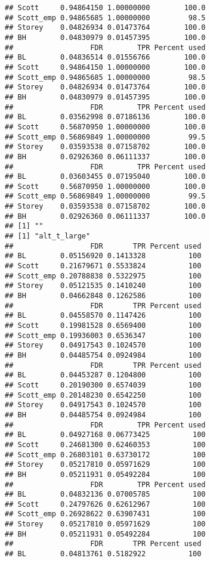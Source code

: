 \documentclass{article}\usepackage[]{graphicx}\usepackage[]{color}
\makeatletter
\newenvironment{kframe}{%
 \def\at@end@of@kframe{}%
 \ifinner\ifhmode%
  \def\at@end@of@kframe{\end{minipage}}%
  \begin{minipage}{\columnwidth}%
 \fi\fi%
 \def\FrameCommand##1{\hskip\@totalleftmargin \hskip-\fboxsep
 \colorbox{shadecolor}{##1}\hskip-\fboxsep
     \hskip-\linewidth \hskip-\@totalleftmargin \hskip\columnwidth}%
 \MakeFramed {\advance\hsize-\width
   \@totalleftmargin\z@ \linewidth\hsize
   \@setminipage}}%
 {\par\unskip\endMakeFramed%
 \at@end@of@kframe}
\newenvironment{knitrout}{}{} %
\makeatother
\begin{document}
\begin{knitrout}
\begin{kframe}
\begin{verbatim}
## Scott     0.94864150 1.00000000        100.0
## Scott_emp 0.94865685 1.00000000         98.5
## Storey    0.04826934 0.01473764        100.0
## BH        0.04830979 0.01457395        100.0
##                  FDR        TPR Percent used
## BL        0.04836514 0.01556766        100.0
## Scott     0.94864150 1.00000000        100.0
## Scott_emp 0.94865685 1.00000000         98.5
## Storey    0.04826934 0.01473764        100.0
## BH        0.04830979 0.01457395        100.0
##                  FDR        TPR Percent used
## BL        0.03562998 0.07186136        100.0
## Scott     0.56870950 1.00000000        100.0
## Scott_emp 0.56869849 1.00000000         99.5
## Storey    0.03593538 0.07158702        100.0
## BH        0.02926360 0.06111337        100.0
##                  FDR        TPR Percent used
## BL        0.03603455 0.07195040        100.0
## Scott     0.56870950 1.00000000        100.0
## Scott_emp 0.56869849 1.00000000         99.5
## Storey    0.03593538 0.07158702        100.0
## BH        0.02926360 0.06111337        100.0
## [1] ""
## [1] "alt_t_large"
##                  FDR       TPR Percent used
## BL        0.05156920 0.1413328          100
## Scott     0.21679671 0.5533824          100
## Scott_emp 0.20788838 0.5322975          100
## Storey    0.05121535 0.1410240          100
## BH        0.04662848 0.1262586          100
##                  FDR       TPR Percent used
## BL        0.04558570 0.1147426          100
## Scott     0.19981528 0.6569400          100
## Scott_emp 0.19936003 0.6536347          100
## Storey    0.04917543 0.1024570          100
## BH        0.04485754 0.0924984          100
##                  FDR       TPR Percent used
## BL        0.04453287 0.1204800          100
## Scott     0.20190300 0.6574039          100
## Scott_emp 0.20148230 0.6542250          100
## Storey    0.04917543 0.1024570          100
## BH        0.04485754 0.0924984          100
##                  FDR        TPR Percent used
## BL        0.04927168 0.06773425          100
## Scott     0.24681300 0.62460353          100
## Scott_emp 0.26803101 0.63730172          100
## Storey    0.05217810 0.05971629          100
## BH        0.05211931 0.05492284          100
##                  FDR        TPR Percent used
## BL        0.04832136 0.07005785          100
## Scott     0.24797626 0.62612967          100
## Scott_emp 0.26928622 0.63907431          100
## Storey    0.05217810 0.05971629          100
## BH        0.05211931 0.05492284          100
##                  FDR       TPR Percent used
## BL        0.04813761 0.5182922          100

\end{verbatim}
\end{kframe}
\end{knitrout}
\end{document}
